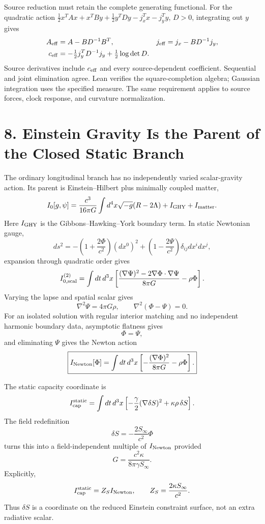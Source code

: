\documentclass[11pt]{article}
\begin{document}
Source reduction must retain the complete generating functional. For the quadratic action $\tfrac12x^TAx+x^TBy+\tfrac12y^TDy-j_x^Tx-j_y^Ty$, $D>0$, integrating out $y$ gives
\[
\begin{aligned}
A_{\rm eff}&=A-BD^{-1}B^T,&j_{\rm eff}&=j_x-BD^{-1}j_y,\\
c_{\rm eff}&=-\tfrac12j_y^TD^{-1}j_y+\tfrac12\log\det D.
\end{aligned}
\]
Source derivatives include $c_{\rm eff}$ and every source-dependent coefficient. Sequential and joint elimination agree. Lean verifies the square-completion algebra; Gaussian integration uses the specified measure. The same requirement applies to source forces, clock response, and curvature normalization.

\section{8. Einstein Gravity Is the Parent of the Closed Static Branch}

The ordinary longitudinal branch has no independently varied scalar-gravity action. Its parent is Einstein--Hilbert plus minimally coupled matter,
\[
I_0[g,\psi]
=\frac{c^3}{16\pi G}\int d^4x\sqrt{-g}(R-2\Lambda)
+I_{\rm GHY}+I_{\rm matter}.
\]
Here $I_{\rm GHY}$ is the Gibbons--Hawking--York boundary term.
In static Newtonian gauge,
\[
ds^2
=-\left(1+\frac{2\Phi}{c^2}\right)(dx^0)^2
+\left(1-\frac{2\Psi}{c^2}\right)\delta_{ij}dx^idx^j,
\]
expansion through quadratic order gives
\[
I_{0,\rm scal}^{(2)}
=\int dt\,d^3x
\left[
\frac{(\nabla\Psi)^2-2\nabla\Phi\cdot\nabla\Psi}{8\pi G}
-\rho\Phi
\right].
\]
Varying the lapse and spatial scalar gives
\[
\nabla^2\Psi=4\pi G\rho,
\qquad
\nabla^2(\Phi-\Psi)=0.
\]
For an isolated solution with regular interior matching and no independent harmonic boundary data, asymptotic flatness gives
\[
\boxed{\Phi=\Psi},
\]
and eliminating $\Psi$ gives the Newton action
\[
\boxed{
I_{\rm Newton}[\Phi]
=\int dt\,d^3x
\left[-\frac{(\nabla\Phi)^2}{8\pi G}-\rho\Phi\right].
}
\]

The static capacity coordinate is
\[
I_{\rm cap}^{\rm static}
=\int dt\,d^3x
\left[-\frac\gamma2(\nabla\delta S)^2+\kappa\rho\,\delta S\right].
\]
The field redefinition
\[
\boxed{
\delta S=-\frac{2S_\infty}{c^2}\Phi
}
\]
turns this into a field-independent multiple of $I_{\rm Newton}$ provided
\[
\boxed{
G=\frac{c^2\kappa}{8\pi\gamma S_\infty}.
}
\]
Explicitly,
\[
I_{\rm cap}^{\rm static}=Z_S I_{\rm Newton},
\qquad
Z_S=\frac{2\kappa S_\infty}{c^2}.
\]
Thus $\delta S$ is a coordinate on the reduced Einstein constraint surface, not an extra radiative scalar.
\end{document}
